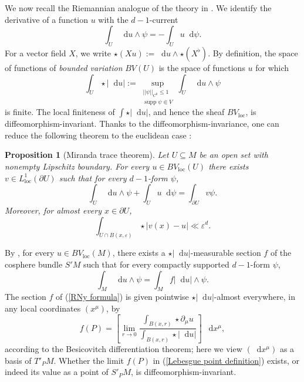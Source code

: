 \documentclass[reqno,10pt]{amsart}
\DeclareMathOperator{\supp}{supp}
\newcommand*\dif{\mathop{}\!\mathrm{d}}
\newcommand{\dfn}[1]{\emph{#1}\index{#1}}
\newcommand{\loc}{\mathrm{loc}}
\newtheorem{proposition}[theorem]{Proposition}
\theoremstyle{definition}
\numberwithin{equation}{section}
\begin{document}
We now recall the Riemannian analogue of the theory in \cite[Chapter 1]{Giusti77}.
We identify the derivative of a function $u$ with the $d-1$-current
$$\int_U \dif u \wedge \psi = -\int_U u \dif \psi.$$
For a vector field $X$, we write $\star (Xu) := \dif u \wedge \star (X^\flat)$.
By definition, the space of functions of \dfn{bounded variation} $BV(U)$ is the space of functions $u$ for which
\begin{equation}\label{total variation}
\int_U \star |\dif u| := \sup_{\substack{||\psi||_{C^0} \leq 1\\\supp \psi \Subset V}} \int_U \dif u \wedge \psi
\end{equation}
is finite.
The local finiteness of $\int \star |\dif u|$, and hence the sheaf $BV_\loc$, is diffeomorphism-invariant.
Thanks to the diffeomorphism-invariance, one can reduce the following theorem to the euclidean case \cite[Teorema 1]{Miranda67}:

\begin{proposition}[Miranda trace theorem]\label{traces}
Let $U \subseteq M$ be an open set with nonempty Lipschitz boundary.
For every $u \in BV_\loc(U)$ there exists $v \in L^1_\loc(\partial U)$ such that for every $d-1$-form $\psi$,
\begin{equation}\label{Miranda IBP}
\int_U \dif u \wedge \psi + \int_U u \dif \psi = \int_{\partial U} v\psi.
\end{equation}
Moreover, for almost every $x \in \partial U$,
\begin{equation}\label{convergence of trace}
\int_{U \cap B(x, \varepsilon)} \star |v(x) - u| \ll \varepsilon^d.
\end{equation}
\end{proposition}

By \cite[Theorem 4.14]{simon1983GMT}, for every $u \in BV_\loc(M)$, there exists a $\star |\dif u|$-measurable section $f$ of the cosphere bundle $S'M$ such that for every compactly supported $d-1$-form $\psi$,
\begin{equation}\label{RNy formula}
\int_M \dif u \wedge \psi = \int_M f|\dif u| \wedge \psi.
\end{equation}
The section $f$ of (\ref{RNy formula}) is given pointwise $\star |\dif u|$-almost everywhere, in any local coordinates $(x^\mu)$, by
\begin{equation}\label{Lebesgue point definition}
    f(P) = \left[\lim_{r \to 0} \frac{\int_{B(x, r)} \star \partial_\mu u}{\int_{B(x, r)} \star |\dif u|}\right] ~\dif x^\mu,
\end{equation}
according to the Besicovitch differentiation theorem; here we view $(\dif x^\mu)$ as a basis of $T'_PM$.
Whether the limit $f(P)$ in (\ref{Lebesgue point definition}) exists, or indeed its value as a point of $S'_PM$, is diffeomorphism-invariant.
\end{document}
